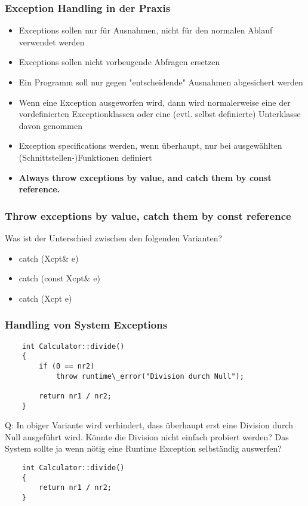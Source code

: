 \subsubsection{Exception Handling in der Praxis}
\label{sec:Exception Handling in der Praxis}
\begin{itemize}
	\item Exceptions sollen nur für Ausnahmen, nicht für den normalen Ablauf verwendet werden
	\item Exceptions sollen nicht vorbeugende Abfragen ersetzen
	\item Ein Programm soll nur gegen "entscheidende" Ausnahmen abgesichert werden
	\item Wenn eine Exception ausgeworfen wird, dann wird normalerweise eine der vordefinierten Exceptionklassen oder eine (evtl. selbst definierte) Unterklasse davon genommen
	\item Exception specifications werden, wenn überhaupt, nur bei ausgewählten (Schnittstellen-)Funktionen definiert
	\item \textbf{Always throw exceptions by value, and catch them by const reference.}
\end{itemize}

\subsubsection{Throw exceptions by value, catch them by const reference}
\label{sec:Throw exceptions by value, catch them by const reference}
Was ist der Unterschied zwischen den folgenden Varianten?
\begin{itemize}
	\item catch (Xcpt\& e) {}
	\item catch (const Xcpt\& e) {}
	\item catch (Xcpt e) {}
\end{itemize}

\subsubsection{Handling von System Exceptions}
\label{sec:Handling von System Exceptions}
\noindent
\begin{minipage}{\linewidth}
	\begin{lstlisting}
	int Calculator::divide()
	{
		if (0 == nr2)
			throw runtime\_error("Division durch Null");
		
		return nr1 / nr2;
	}
	\end{lstlisting}
\end{minipage}
Q: In obiger Variante wird verhindert, dass überhaupt erst eine Division durch Null ausgeführt wird. Könnte die Division nicht einfach probiert werden? Das System sollte ja wenn nötig eine Runtime Exception selbständig auswerfen?
\noindent
\begin{minipage}{\linewidth}
	\begin{lstlisting}
	int Calculator::divide()
	{
		return nr1 / nr2;
	}
	\end{lstlisting}
\end{minipage}

